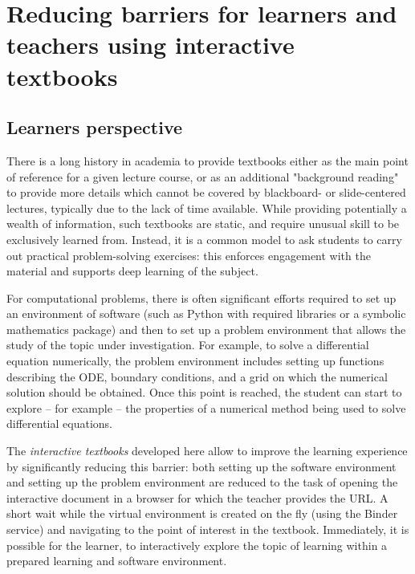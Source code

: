 \documentclass{deliverablereport}
\author{Hans Fangohr, Thomas Kluyver, Marijan Beg, Min
Ragan-Kelley, Vidar Fauske, Marcin Kostur, Jerzy \L{}uczka
 }
\begin{document}
\maketitle
\githubissuedescription
\tableofcontents
\newpage

%

\section{Reducing barriers for learners and teachers using interactive textbooks}

\subsection{Learners perspective}

There is a long history in academia to provide textbooks either as
the main point of reference for a given lecture course, or as an
additional "background reading" to provide more details which cannot
be covered by blackboard- or slide-centered lectures, typically due to
the lack of time available.
%
While providing potentially a wealth of information, such textbooks
are static, and require unusual skill to be exclusively learned
from. Instead, it is a common model to ask students to carry out
practical problem-solving exercises: this enforces engagement with the
material and supports deep learning of the subject.

For computational problems, there is often significant efforts required
to set up an environment of software (such as Python with required
libraries or a symbolic mathematics package) and then to set up a
problem environment that allows the study of the topic under
investigation. For example, to solve a differential equation
numerically, the problem environment includes setting up functions
describing the ODE, boundary conditions, and a grid on which the
numerical solution should be obtained. Once this point is reached, the
student can start to explore -- for example -- the properties of a
numerical method being used to solve differential equations.

The \emph{interactive textbooks} developed here allow to improve the
learning experience by significantly reducing this barrier: both
setting up the software environment and setting up the problem
environment are reduced to the task of opening the interactive
document in a browser for which the teacher provides the URL. A short
wait while the virtual environment is created on the fly (using the
Binder service) and navigating to the point of interest in the
textbook. Immediately, it is possible for the learner, to
interactively explore the topic of learning within a prepared learning
and software environment.
\end{document}
